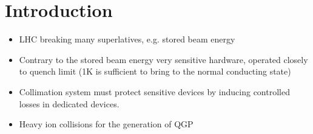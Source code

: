 \chapter{Introduction}


\begin{itemize}
\item LHC breaking many superlatives, e.g. stored beam energy
\item Contrary to the stored beam energy very sensitive hardware, operated closely to quench limit (1K is sufficient to bring to the normal conducting state)
\item Collimation system must protect sensitive devices by inducing controlled losses in dedicated devices.
\item Heavy ion collisions for the generation of QGP
\end{itemize}